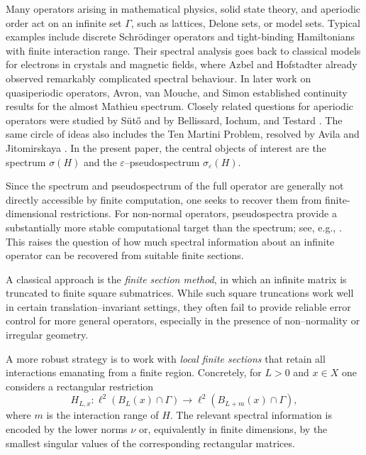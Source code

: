 \documentclass[11pt]{article}
\theoremstyle{definition}
\begin{document}
Many operators arising in mathematical physics, solid state theory, and aperiodic
order act on an infinite set $\Gamma$, such as lattices, Delone sets, or model
sets. Typical examples include discrete Schr\"odinger operators and tight-binding
Hamiltonians with finite interaction range. Their spectral analysis goes back to
classical models for electrons in crystals and magnetic fields, where Azbel
\cite{Azbel1964} and Hofstadter \cite{Hofstadter1976} already observed remarkably
complicated spectral behaviour. In later work on quasiperiodic operators, Avron,
van Mouche, and Simon \cite{AvronVanMoucheSimon1990} established continuity
results for the almost Mathieu spectrum. Closely related questions for aperiodic
operators were studied by S\"ut\H{o} \cite{Suto1987} and by Bellissard, Iochum,
and Testard \cite{BellissardIochumTestard1991}. The same circle of ideas also
includes the Ten Martini Problem, resolved by Avila and Jitomirskaya
\cite{AvilaJitomirskaya2009}. In the present paper, the central objects of interest are the spectrum
$\sigma(H)$ and the $\varepsilon$--pseudospectrum
$\sigma_\varepsilon(H)$. 

Since the spectrum and pseudospectrum of the full operator are generally not
directly accessible by finite computation, one seeks to recover them from
finite-dimensional restrictions. For non-normal operators, pseudospectra provide
a substantially more stable computational target than the spectrum; see, e.g.,
\cite{TrefethenEmbree2005}. This raises the question of how much spectral
information about an infinite operator can be recovered from suitable finite
sections.

A classical approach is the \emph{finite section method}, in which an
infinite matrix is truncated to finite square submatrices. While such
square truncations work well in certain translation--invariant settings,
they often fail to provide reliable error control for more general
operators, especially in the presence of non--normality or irregular
geometry.

A more robust strategy is to work with \emph{local finite sections} that retain
all interactions emanating from a finite region. Concretely, for $L>0$ and
$x\in X$ one considers a rectangular restriction
\[
  H_{L,x}:\ell^2(B_L(x)\cap\Gamma)\longrightarrow \ell^2(B_{L+m}(x)\cap\Gamma),
\]
where $m$ is the interaction range of $H$.
The relevant spectral information is encoded by the lower norms
$\nu$ or, equivalently in finite dimensions, by the
smallest singular values of the corresponding rectangular matrices.
\end{document}
